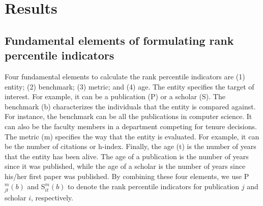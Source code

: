 \section*{Results}
\subsection*{Fundamental elements of formulating rank percentile indicators}
Four fundamental elements to calculate the rank percentile indicators are (1) entity; (2) benchmark; (3) metric; and (4) age. The entity specifies the target of interest. For example, it can be a publication (P) or a scholar (S). The benchmark (b) characterizes the individuals that the entity is compared against. For instance, the benchmark can be all the publications in computer science. It can also be the faculty members in a department competing for tenure decisions. The metric (m) specifies the way that the entity is evaluated. For example, it can be the number of citations or h-index. Finally, the age (t) is the number of years that the entity has been alive. The age of a publication is the number of years since it was published, while the age of a scholar is the number of years since his/her first paper was published. By combining these four elements, we use P$_{jt}^{m}(b)$ and S$_{it}^{m}(b)$ to denote the rank percentile indicators for publication $j$ and scholar $i$, respectively. 

